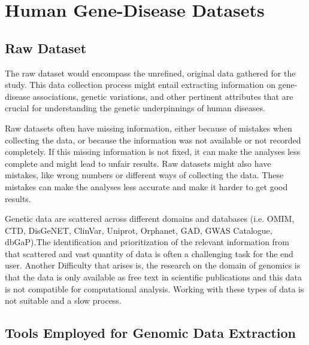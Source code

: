  

 

\section{Human Gene-Disease Datasets}


\subsection{Raw Dataset}

The raw dataset would encompass the unrefined, original data gathered for the study. This data collection process might entail extracting information on gene-disease associations, genetic variations, and other pertinent attributes that are crucial for understanding the genetic underpinnings of human diseases.

Raw datasets often have missing information, either because of mistakes when collecting the data, or because the information was not available or not recorded completely. If this missing information is not fixed, it can make the analyses less complete and might lead to unfair results. Raw datasets might also have mistakes, like wrong numbers or different ways of collecting the data. These mistakes can make the analyses less accurate and make it harder to get good results. 

Genetic data are scattered across different domains and databases (i.e. OMIM\cite{2}, CTD\cite{3}, DisGeNET\cite{4}, ClinVar\cite{5}, Uniprot\cite{6}, Orphanet\cite{7}, GAD\cite{8}, GWAS Catalogue\cite{9}, dbGaP\cite{10}).The identification and prioritization of the relevant information from that scattered and vast quantity of data is often a challenging task for the end user. Another Difficulty that arises is, the research on the domain of genomics is that the data is only available as free text in scientific publications and this data is not compatible for computational analysis. Working with these types of data is not suitable and a slow process.  

\subsection{Tools Employed for Genomic Data Extraction}

